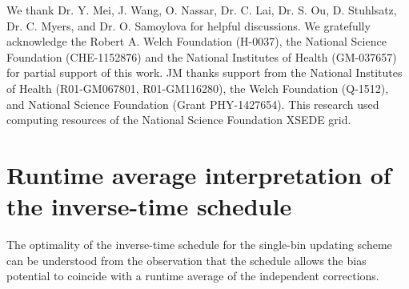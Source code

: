 \documentclass[reprint, superscriptaddress, floatfix]{revtex4-1}
\begin{document}
We thank Dr. Y. Mei, J. Wang,
O. Nassar, Dr. C. Lai, Dr. S. Ou, D. Stuhlsatz,
Dr. C. Myers, and Dr. O. Samoylova
for helpful discussions.
%
We gratefully acknowledge the Robert A. Welch Foundation (H-0037),
the National Science Foundation (CHE-1152876)
and the National Institutes of Health (GM-037657)
for partial support of this work.
%
JM thanks support from the National Institutes of Health (R01-GM067801, R01-GM116280),
the Welch Foundation (Q-1512),
and National Science Foundation (Grant PHY-1427654).
%
This research used computing resources of the National Science Foundation XSEDE grid.
%
%


\appendix




\section{\label{sec:equilerr}
Runtime average interpretation
of the inverse-time schedule
}



The optimality of the inverse-time schedule
for the single-bin updating scheme
can be understood from the observation that
the schedule allows the bias potential
to coincide with a runtime average
of the independent corrections.
%
\end{document}
